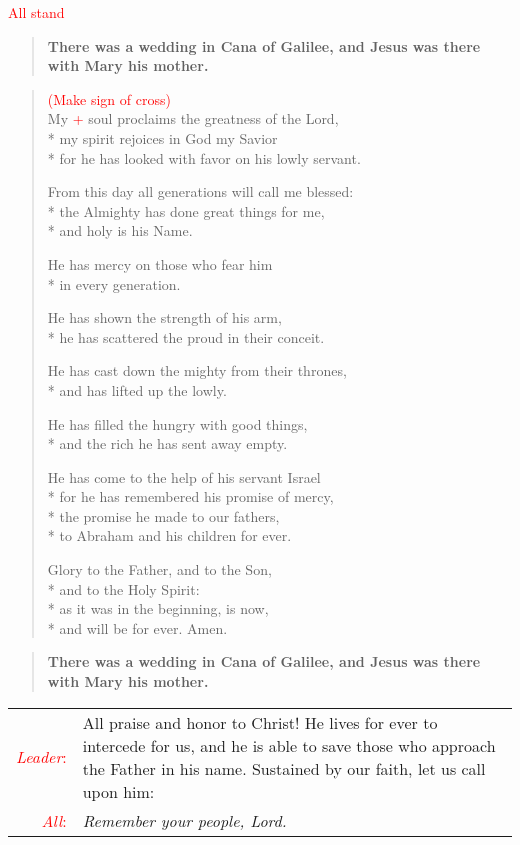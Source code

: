 \documentclass[letterpaper,14pt]{extarticle}
\newcommand{\side}[1]{\flagverse{\textcolor{red}{\textit{#1}}:}}
\newcommand{\sidestar}[1]{\textcolor{red}{\textit{#1}:}}
\newcommand{\rednote}[1]{\textcolor{red}{#1}}
\newlength{\oldindent}
\newcommand{\antiphon}[2]{
	\setlength{\oldindent}{\vindent}
	\setlength{\vindent}{0em}
	\begin{verse}
	\side{#1} \textbf{#2}
	\end{verse}
	\setlength{\vindent}{\oldindent}
}
\newcommand{\intercession}[2]{
	\begin{tabular}[h]{r p{4.25in}}
		\sidestar{Leader} & #1 \\
		\sidestar{All} & #2
	\end{tabular}}
\begin{document}
\rednote{All stand}
\antiphon{Leader}{There was a wedding in Cana of Galilee, and Jesus was there with Mary his mother.}
\begin{verse}
\rednote{(Make sign of cross)}\\
\side{All} My \rednote{+} soul proclaims the greatness of the Lord, \\*
my spirit rejoices in God my Savior \\*
for he has looked with favor on his lowly servant.

From this day all generations will call me blessed: \\*
the Almighty has done great things for me, \\*
and holy is his Name.

He has mercy on those who fear him \\*
in every generation.

He has shown the strength of his arm, \\*
he has scattered the proud in their conceit.

He has cast down the mighty from their thrones, \\*
and has lifted up the lowly.

He has filled the hungry with good things, \\*
and the rich he has sent away empty.

He has come to the help of his servant Israel \\*
for he has remembered his promise of mercy, \\*
the promise he made to our fathers, \\*
to Abraham and his children for ever.

Glory to the Father, and to the Son, \\*
and to the Holy Spirit: \\*
as it was in the beginning, is now, \\*
and will be for ever. Amen.
\end{verse}
\antiphon{All}{There was a wedding in Cana of Galilee, and Jesus was there with Mary his mother.}

\intercession{All praise and honor to Christ! He lives for ever to intercede for us, and he is able to save those who approach the Father in his name. Sustained by our faith, let us call upon him:}
{\textit{Remember your people, Lord.}}
\end{document}

